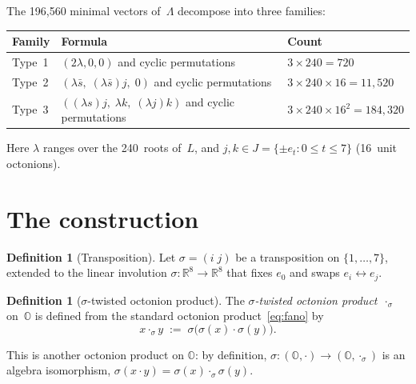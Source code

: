 \documentclass[twoside,english]{paper}
\numberwithin{equation}{section}
\numberwithin{figure}{section}
\theoremstyle{definition}
\newtheorem{definition}[theorem]{Definition}
\theoremstyle{remark}
\newcommand{\OO}{\mathbb{O}}          %
\newcommand{\RR}{\mathbb{R}}
\newcommand{\LL}{\Lambda}             %
\begin{document}
The 196{,}560 minimal vectors of~$\LL$ decompose into three families:

\smallskip
\begin{tabular}{@{}lll@{}}
\toprule
Family & Formula & Count \\
\midrule
Type~1 & $(2\lambda, 0, 0)$ and cyclic permutations & $3 \times 240 = 720$ \\
Type~2 & $(\lambda\bar{s},\; (\lambda\bar{s})j,\; 0)$ and cyclic
  permutations & $3 \times 240 \times 16 = 11{,}520$ \\
Type~3 & $((\lambda s)j,\; \lambda k,\; (\lambda j)k)$ and cyclic
  permutations & $3 \times 240 \times 16^2 = 184{,}320$ \\
\bottomrule
\end{tabular}
\smallskip

\noindent
Here $\lambda$ ranges over the 240~roots of~$L$, and
$j, k \in J = \{\pm e_t : 0 \le t \le 7\}$ (16~unit octonions).

\section{The construction}\label{sec:construction}

\begin{definition}[Transposition]\label{def:twist}
Let $\sigma = (i\; j)$ be a transposition on $\{1, \ldots, 7\}$,
extended to the linear involution $\sigma \colon \RR^8 \to \RR^8$
that fixes $e_0$ and swaps $e_i \leftrightarrow e_j$.
\end{definition}

\begin{definition}[$\sigma$-twisted octonion product]\label{def:twisted-product}
The \emph{$\sigma$-twisted octonion product}~$\cdot_\sigma$ on~$\OO$
is defined from the standard octonion product~\eqref{eq:fano} by
\begin{equation}\label{eq:twist-formula}
  x \cdot_\sigma y \;:=\; \sigma\bigl(\sigma(x) \cdot \sigma(y)\bigr).
\end{equation}
\end{definition}

This is another octonion product on $\OO$: by definition,
$\sigma \colon (\OO, \cdot) \to (\OO, \cdot_\sigma)$ is an algebra
isomorphism, $\sigma(x \cdot y) = \sigma(x) \cdot_\sigma \sigma(y)$.
\end{document}
